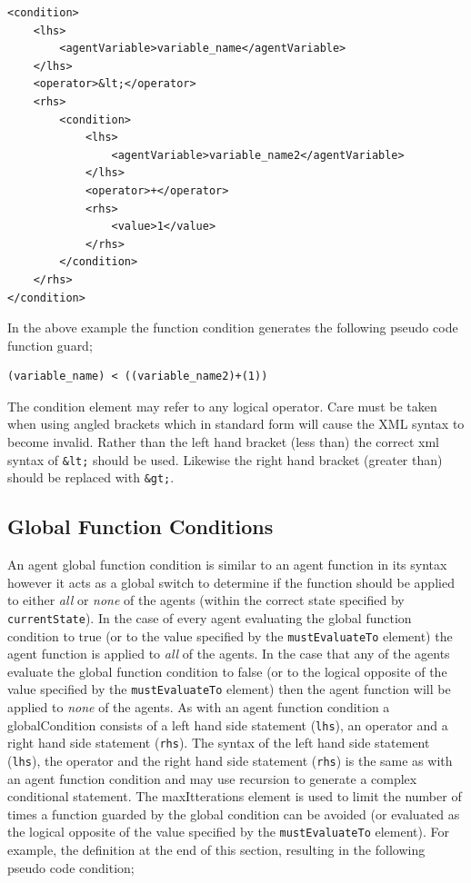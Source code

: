 \documentclass[11pt, a4paper, onecolumn, oneside]{report}
\begin{document}
\begin{verbatim}
<condition>
    <lhs>
        <agentVariable>variable_name</agentVariable>
    </lhs>
    <operator>&lt;</operator>
    <rhs>
        <condition>
            <lhs>
                <agentVariable>variable_name2</agentVariable>
            </lhs>
            <operator>+</operator>
            <rhs>
                <value>1</value>
            </rhs>
        </condition>
    </rhs>
</condition>
\end{verbatim}

In the above example the function condition generates the following pseudo code function guard;

\begin{verbatim}
(variable_name) < ((variable_name2)+(1))
\end{verbatim}

The condition element may refer to any logical operator.
Care must be taken when using angled brackets which in standard form will cause the XML syntax to become invalid.
Rather than the left hand bracket (less than) the correct xml syntax of 
\texttt{&lt;} should be used.
Likewise the right hand bracket (greater than) should be replaced with 
\texttt{&gt;}.


\subsection{Global Function Conditions}
\label{sec:255}


An agent global function condition is similar to an agent function in its syntax however it acts as a global switch to determine if the function should be applied to either \emph{all} or \emph{none} of the agents (within the correct state specified by \texttt{currentState}).
In the case of every agent evaluating the global function condition to true (or to the value specified by the \texttt{mustEvaluateTo} element) the agent function is applied to \emph{all} of the agents.
In the case that any of the agents evaluate the global function condition to false (or to the logical opposite of the value specified by the \texttt{mustEvaluateTo} element) then the agent function will be applied to \emph{none} of the agents.
As with an agent function condition a globalCondition consists of a left hand side statement (\texttt{lhs}), an operator and a right hand side statement (\texttt{rhs}).
The syntax of the left hand side statement (\texttt{lhs}), the operator and the right hand side statement (\texttt{rhs}) is the same as with an agent function condition and may use recursion to generate a complex conditional statement.
The maxItterations element is used to limit the number of times a function guarded by the global condition can be avoided (or evaluated as the logical opposite of the value specified by the \texttt{mustEvaluateTo} element).
For example, the definition at the end of this section, resulting in the following pseudo code condition;
\end{document}
